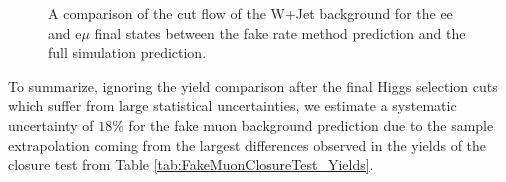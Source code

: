 \begin{figure}[!htbp]
\begin{center}
\caption{A comparison of the cut flow of the W+Jet background for the ee and e$\mu$ final states
between the fake rate method prediction and the full simulation prediction. }
\label{fig:FakeMuonClosureTest_CutFlow}
\end{center}
\end{figure}

To summarize, ignoring the yield comparison after the final Higgs selection cuts which 
suffer from large statistical uncertainties, we estimate a systematic uncertainty of 
$18\%$ for the fake muon background prediction due to the sample extrapolation 
coming from the largest differences observed in the yields of the closure test from 
Table \ref{tab:FakeMuonClosureTest_Yields}. 


